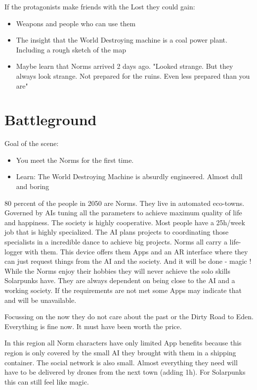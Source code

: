If the protagonists make friends with the Lost they could gain:

\begin{itemize}
    \item Weapons and people who can use them
    \item The insight that the World Destroying machine is a coal power plant. Including a rough sketch of the map
    \item Maybe learn that Norms arrived 2 days ago. "Looked strange. But they always look strange. Not prepared for the ruins. Even less prepared than you are"
\end{itemize}

\section{Battleground}

Goal of the scene:

\begin{itemize}
\item You meet the Norms for the first time.
\item Learn: The World Destroying Machine is absurdly engineered. Almost dull and boring
\end{itemize}

\begin{sidebarBox}[title=Norms]

80 percent of the people in 2050 are Norms. They live in automated eco-towns. Governed by AIs tuning all the parameters to achieve maximum quality of life and happiness. The society is highly cooperative. Most people have a 25h/week job that is highly specialized. The AI plans projects to coordinating those specialists in a incredible dance to achieve big projects.
Norms all carry a life-logger with them. This device offers them Apps and an AR interface where they can just request things from the AI and the society. And it will be done - magic !
While the Norms enjoy their hobbies they will never achieve the solo skills Solarpunks have. They are always dependent on being close to the AI and a working society. If the requirements are not met some Apps may indicate that and will be unavailable.

Focussing on the now they do not care about the past or the Dirty Road to Eden. Everything is fine now. It must have been worth the price.

In this region all Norm characters have only limited App benefits because this region is only covered by the small AI they brought with them in a shipping container. The social network is also small. Almost everything they need will have to be delivered by drones from the next town (adding 1h). For Solarpunks this can still feel like magic.

\end{sidebarBox}

